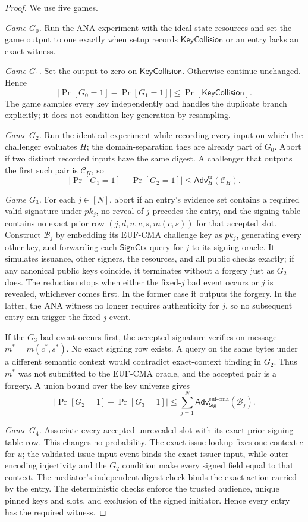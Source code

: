 \documentclass[10pt]{article}
\newcommand{\Adv}{\mathsf{Adv}}
\begin{document}
\begin{proof}
We use five games.

\emph{Game $G_0$.} Run the ANA experiment with the ideal state resources and
set the game output to one exactly when setup records $\mathsf{KeyCollision}$
or an entry lacks an exact witness.

\emph{Game $G_1$.} Set the output to zero on $\mathsf{KeyCollision}$. Otherwise
continue unchanged. Hence
\[
 |\Pr[G_0=1]-\Pr[G_1=1]|
 \leq\Pr[\mathsf{KeyCollision}].
\]
The game samples every key independently and handles the duplicate branch
explicitly; it does not condition key generation by resampling.

\emph{Game $G_2$.} Run the identical experiment while recording every input on
which the challenger evaluates $H$; the domain-separation tags are already part
of $G_0$. Abort if two distinct recorded inputs have the same digest. A
challenger that outputs the first such pair is $\mathcal C_H$, so
\[
 |\Pr[G_1=1]-\Pr[G_2=1]|
 \leq\Adv^{\mathrm{cr}}_H(\mathcal C_H).
\]

\emph{Game $G_3$.} For each $j\in[N]$, abort if an entry's evidence set contains
a required valid signature under $pk_j$, no reveal of $j$ precedes the entry,
and the signing
table contains no exact prior row $(j,d,u,c,s,m(c,s))$ for that accepted slot.
Construct $\mathcal B_j$ by embedding its EUF-CMA challenge key as $pk_j$,
generating every other key, and forwarding each $\mathsf{SignCtx}$ query for
$j$ to its signing oracle. It simulates issuance, other signers, the resources,
and all public checks exactly; if any canonical public keys coincide, it
terminates without a forgery just as $G_2$ does. The reduction stops when either
the fixed-$j$ bad event occurs or $j$ is revealed, whichever comes first. In the
former case it outputs the forgery. In the latter, the ANA witness no longer
requires authenticity for $j$, so no subsequent entry can trigger the fixed-$j$
event.

If the $G_3$ bad event occurs first, the accepted signature verifies on message
$m^*=m(c^*,s^*)$. No exact signing row exists. A query on the same bytes under
a different semantic context would contradict exact-context binding in $G_2$.
Thus $m^*$ was not submitted to the EUF-CMA oracle, and the accepted pair is a
forgery. A union bound over the key universe gives
\[
 |\Pr[G_2=1]-\Pr[G_3=1]|
 \leq\sum_{j=1}^{N}
 \Adv^{\mathrm{euf\mbox{-}cma}}_{\mathsf{Sig}}(\mathcal B_j).
\]

\emph{Game $G_4$.} Associate every accepted unrevealed slot with its exact prior
signing-table row. This changes no probability. The exact issue lookup fixes one
context $c$ for $u$; the validated issue-input event binds the exact issuer
input, while outer-encoding injectivity and the $G_2$ condition make every
signed field equal to that context. The mediator's independent digest check
binds the exact action carried by the entry. The deterministic checks enforce
the trusted audience, unique pinned keys and slots, and exclusion of the signed
initiator. Hence every entry has the required witness.


\end{proof}
\end{document}
